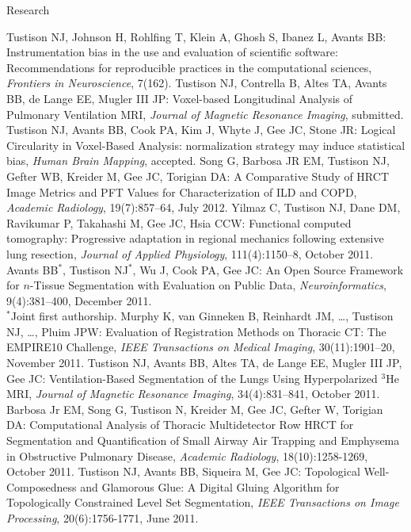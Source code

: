 \documentclass{resume}
\begin{document}
\begin{category}{Research}
   \begin{itemize}
    \citemnobullet Tustison NJ, Johnson H, Rohlfing T, Klein A, Ghosh S, Ibanez L, Avants BB: Instrumentation bias in the use and evaluation of scientific software: Recommendations for reproducible practices in the computational sciences, {\em Frontiers in Neuroscience}, 7(162).
    \citemnobullet Tustison NJ, Contrella B, Altes TA, Avants BB, de Lange EE, Mugler III JP: Voxel-based Longitudinal Analysis of Pulmonary Ventilation MRI, {\em Journal of Magnetic Resonance Imaging}, submitted.
    \citemnobullet Tustison NJ, Avants BB, Cook PA, Kim J, Whyte J, Gee JC, Stone JR: Logical Circularity in Voxel-Based Analysis:  normalization strategy may induce statistical bias, {\em Human Brain Mapping}, accepted.
    \citemnobullet Song G, Barbosa JR EM, Tustison NJ, Gefter WB, Kreider M, Gee JC, Torigian DA: A Comparative Study of HRCT Image Metrics and PFT Values for Characterization of ILD and COPD, {\em Academic Radiology}, 19(7):857--64, July 2012.
    \citemnobullet Yilmaz C, Tustison NJ, Dane DM, Ravikumar P, Takahashi M, Gee JC, Hsia CCW:  Functional computed tomography:  Progressive adaptation in regional mechanics following extensive lung resection, {\em Journal of Applied Physiology}, 111(4):1150--8, October 2011.
    \citemnobullet Avants BB$^*$, Tustison NJ$^*$, Wu J, Cook PA, Gee JC:  An Open Source Framework for $n$-Tissue Segmentation with Evaluation on Public Data, {\em Neuroinformatics}, 9(4):381--400, December 2011.\\
    $^*$Joint first authorship.
    \citemnobullet Murphy K, van Ginneken B, Reinhardt JM, \ldots, Tustison NJ, \ldots, Pluim JPW:  Evaluation of Registration Methods on Thoracic CT:  The EMPIRE10 Challenge,  {\em IEEE Transactions on Medical Imaging}, 30(11):1901--20, November 2011.
    \citemnobullet Tustison NJ, Avants BB, Altes TA, de Lange EE, Mugler III JP, Gee JC:  Ventilation-Based Segmentation of the Lungs Using Hyperpolarized $^3$He MRI, {\em Journal of Magnetic Resonance Imaging}, 34(4):831--841, October 2011.
    \citemnobullet Barbosa Jr EM, Song G, Tustison N, Kreider M, Gee JC, Gefter W, Torigian DA:  Computational Analysis of Thoracic Multidetector Row HRCT for Segmentation and Quantification of Small Airway Air Trapping and Emphysema in Obstructive Pulmonary Disease, {\em Academic Radiology}, 18(10):1258-1269, October 2011.
    \citemnobullet Tustison NJ, Avants BB, Siqueira M, Gee JC:  Topological Well-Composedness and Glamorous Glue:  A Digital Gluing Algorithm for Topologically Constrained Level Set Segmentation, {\em IEEE Transactions on Image Processing}, 20(6):1756-1771, June 2011.

\end{itemize}
\end{category}
\end{document}
